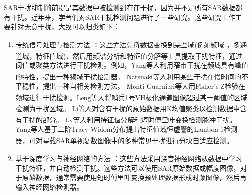 \documentclass[10.5pt,UTF8]{JR}
\theoremstyle{mystyle}
\newcommand{\upcite}[1]{\textsuperscript{\cite{#1}}}
\begin{document}
SAR干扰抑制的前提是其数据中被检测到存在干扰，因为并不是所有SAR数据都有干扰。近年来，学者们对SAR干扰检测问题进行了一些研究。这些研究工作主要针对无意干扰，大致可以归类如下：
\begin{enumerate}
\setlength{\itemsep}{0pt}
\setlength{\parsep}{0pt}
  \item 传统信号处理与检测方法
\upcite{yangDetectionSuppressionNarrow2015,
natsuakiAutocorrelationBasedRadioFrequency2017b,
monti-guarnieriIdentificationCBandRadio2017,
bollianDetectionGeolocationBand2018,
natsuakiSimilarityApproachRadio2020,
lvTwoStepApproachPulse2021b,
lengRadioFrequencyInterference2021,
liPulseRFIMitigation2022a,
huangRadioFrequencyInterference2023,
liObservationMitigationMutual2022a}：这些方法先将数据变换到某些域(例如频域
\upcite{yangDetectionSuppressionNarrow2015,monti-guarnieriIdentificationCBandRadio2017,
bollianDetectionGeolocationBand2018,liObservationMitigationMutual2022a}，多通道域\upcite{natsuakiSimilarityApproachRadio2020,lengRadioFrequencyInterference2021}，特征值域\upcite{lvTwoStepApproachPulse2021b,liPulseRFIMitigation2022a,huangRadioFrequencyInterference2023,10841461})，然后用频谱分析和特征值分解等工具提取干扰特征，通过阈值或聚类方法进行干扰检测。例如，Yang等人利用窄带干扰在频域具有峰值的特性，提出一种频域干扰检测器\upcite{yangDetectionSuppressionNarrow2015}。
Natsuaki等人利用某些干扰在慢时间的不平稳性，提出一种自相关检测方法。
 Monti-Guarnieri等人用Fisher's Z检验在频域进行干扰检测\upcite{monti-guarnieriIdentificationCBandRadio2017}。Leng等人将哨兵1号VH极化通道图像超过某一阈值的区域检测为干扰区域\upcite{lengRadioFrequencyInterference2021}。
Li等人对含有干扰的原始数据用K均值聚类以检测数据中含有干扰的部分\upcite{liObservationMitigationMutual2022a}。
Lv等人利用特征值分解和短时傅里叶变换检测脉冲干扰\upcite{lvTwoStepApproachPulse2021b}。Yang等人基于二阶Tracy-Widom分布提出特征值域恒虚警的Lambda-1检测器\upcite{10841461}，可对星载SAR单视复数图像中的多种常见干扰进行分块自适应检测。
\item %
基于深度学习与神经网络的方法
\upcite{yuMulticlassRadioFrequency2018,
artiemjewDeepLearningRFI2021a,
taoRadioFrequencyInterference2021,
liSemanticCognitionEnhancment2021a,
luAutomaticRFIIdentification2022,
taoRadioFrequencyInterference2022b,
cenSelfSupervisedLearningMethod2023,
zhaoIntelligentDetectionSegmentation2023a,
sorensenRADIOFREQUENCYINTERFERENCE2023a,s20102919}：这些方法采用深度神经网络从数据中学习干扰特征，并自动检测干扰。这些方法可以使用SAR原始数据或幅度图像。对于原始数据，通常需要使用短时傅里叶变换预处理数据形成时频图像，然后再输入神经网络检测器。

\end{enumerate}
\end{document}
